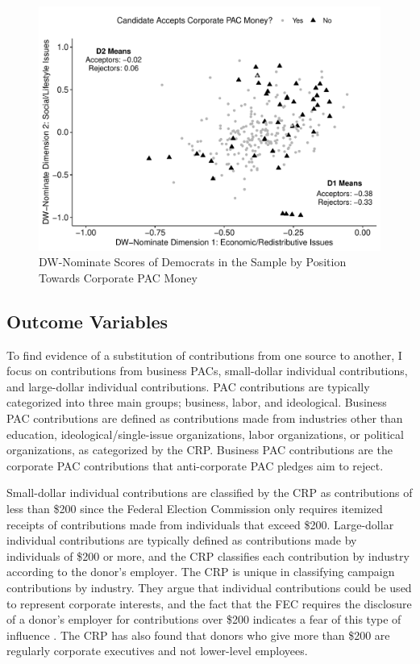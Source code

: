 \documentclass[12pt]{article}
\begin{document}
\begin{figure}[!htb]
    \centering
    \includegraphics[width=0.75\linewidth]{nominate_plot.pdf}
    \caption{DW-Nominate Scores of Democrats in the Sample by Position Towards Corporate PAC Money}
    \label{fig: nominate plot}
\end{figure}

\subsection{Outcome Variables}

To find evidence of a substitution of contributions from one source to another, I focus on contributions from business PACs, small-dollar individual contributions, and large-dollar individual contributions. PAC contributions are typically categorized into three main groups; business, labor, and ideological. Business PAC contributions are defined as contributions made from industries other than education, ideological/single-issue organizations, labor organizations, or political organizations, as categorized by the CRP. Business PAC contributions are the corporate PAC contributions that anti-corporate PAC pledges aim to reject.   

Small-dollar individual contributions are classified by the CRP as contributions of less than \$200 since the Federal Election Commission only requires itemized receipts of contributions made from individuals that exceed \$200. Large-dollar individual contributions are typically defined as contributions made by individuals of \$200 or more, and the CRP classifies each contribution by industry according to the donor's employer. The CRP is unique in classifying campaign contributions by industry. They argue that individual contributions could be used to represent corporate interests, and the fact that the FEC requires the disclosure of a donor's employer for contributions over \$200 indicates a fear of this type of influence \citep{opensecrets.org2019a}. The CRP has also found that donors who give more than \$200 are regularly corporate executives and not lower-level employees. 
\end{document}
